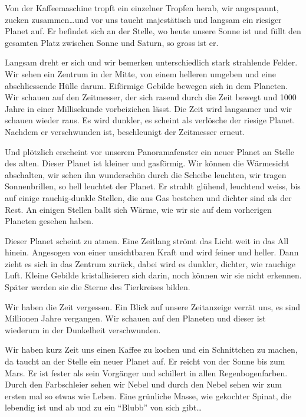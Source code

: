\documentclass[11pt,titlepage,a5paper]{book}
\begin{document}
Von der Kaffeemaschine tropft ein einzelner Tropfen herab, wir angespannt, zucken zusammen\dots und vor uns taucht majestätisch und langsam ein riesiger Planet auf. Er befindet sich an der Stelle, wo heute unsere Sonne ist und füllt den gesamten Platz zwischen Sonne und Saturn, so gross ist er. 

Langsam dreht er sich und wir bemerken unterschiedlich stark strahlende Felder. Wir sehen ein Zentrum in der Mitte, von einem helleren umgeben und eine abschliessende Hülle darum. Eiförmige Gebilde  bewegen sich in dem Planeten. Wir schauen auf den Zeitmesser, der sich rasend durch die Zeit bewegt und 1000 Jahre in einer Millisekunde vorbeiziehen lässt. Die Zeit wird langsamer und wir schauen wieder raus. Es wird dunkler, es scheint als verlösche der riesige Planet. Nachdem er verschwunden ist, beschleunigt der Zeitmesser erneut. 

Und plötzlich erscheint vor unserem Panoramafenster ein neuer Planet an Stelle des alten. Dieser Planet ist kleiner und gasförmig. Wir können die Wärmesicht abschalten, wir sehen ihn wunderschön durch die Scheibe leuchten, wir tragen Sonnenbrillen, so hell leuchtet der Planet. Er strahlt glühend, leuchtend weiss, bis auf einige rauchig-dunkle Stellen, die aus Gas bestehen und dichter sind als der Rest. An einigen Stellen ballt sich Wärme, wie wir sie auf dem vorherigen Planeten gesehen haben.

Dieser Planet scheint zu atmen. Eine Zeitlang strömt das Licht weit in das All hinein. Angesogen von einer unsichtbaren Kraft und wird feiner und heller. Dann zieht es sich in das Zentrum zurück, dabei wird es dunkler, dichter, wie rauchige Luft. Kleine Gebilde kristallisieren sich darin, noch können wir sie nicht erkennen. Später werden sie die Sterne des Tierkreises bilden.

Wir haben die Zeit vergessen. Ein Blick auf unsere Zeitanzeige verrät uns, es sind Millionen Jahre vergangen. Wir schauen auf den Planeten und dieser ist wiederum in der Dunkelheit verschwunden.

Wir haben kurz Zeit uns einen Kaffee zu kochen und ein Schnittchen zu machen, da taucht an der Stelle ein neuer Planet auf. Er reicht von der Sonne bis zum Mars. Er ist fester als sein Vorgänger und schillert in allen Regenbogenfarben. Durch den Farbschleier sehen wir Nebel und durch den Nebel sehen wir zum ersten mal so etwas wie Leben. Eine grünliche Masse, wie gekochter Spinat, die lebendig ist und ab und zu ein "`Blubb"' von sich gibt\dots
\end{document}
